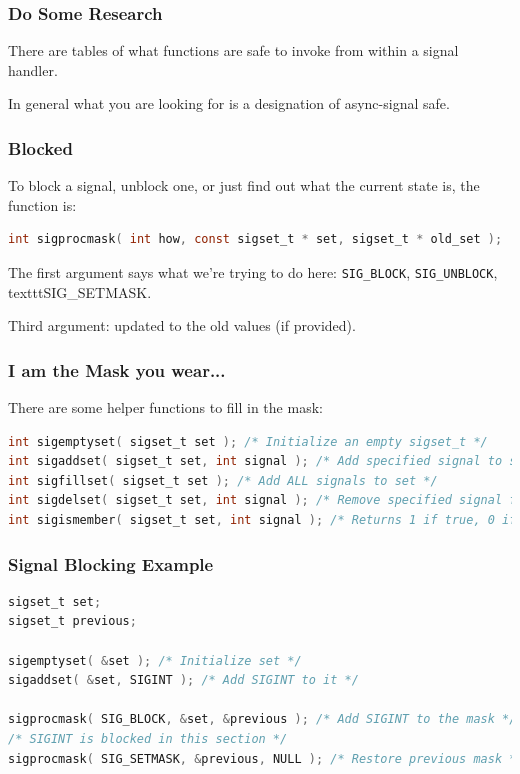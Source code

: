 \begin{frame}
	\frametitle{Do Some Research}

	There are tables of what functions are safe to invoke from within a signal handler.

	In general what you are looking for is a designation of \alert{async-signal safe}.

\end{frame}


\begin{frame}[fragile]
	\frametitle{Blocked}

	To block a signal, unblock one, or just find out what the current state is, the function is:
	\begin{lstlisting}[language=C]
int sigprocmask( int how, const sigset_t * set, sigset_t * old_set );
\end{lstlisting}

	The first argument says what we're trying to do here: \texttt{SIG\_BLOCK}, \texttt{SIG\_UNBLOCK}, texttt{SIG\_SETMASK}.

	Third argument: updated to the old values (if provided).

\end{frame}


\begin{frame}[fragile]
	\frametitle{I am the Mask you wear...}

	There are some helper functions to fill in the mask:
	\begin{lstlisting}[language=C]
int sigemptyset( sigset_t set ); /* Initialize an empty sigset_t */
int sigaddset( sigset_t set, int signal ); /* Add specified signal to set */
int sigfillset( sigset_t set ); /* Add ALL signals to set */
int sigdelset( sigset_t set, int signal ); /* Remove specified signal from set */
int sigismember( sigset_t set, int signal ); /* Returns 1 if true, 0 if false */
\end{lstlisting}

\end{frame}


\begin{frame}[fragile]
	\frametitle{Signal Blocking Example}

	\begin{lstlisting}[language=C]
sigset_t set;
sigset_t previous;

sigemptyset( &set ); /* Initialize set */
sigaddset( &set, SIGINT ); /* Add SIGINT to it */

sigprocmask( SIG_BLOCK, &set, &previous ); /* Add SIGINT to the mask */
/* SIGINT is blocked in this section */
sigprocmask( SIG_SETMASK, &previous, NULL ); /* Restore previous mask */

\end{lstlisting}

\end{frame}


